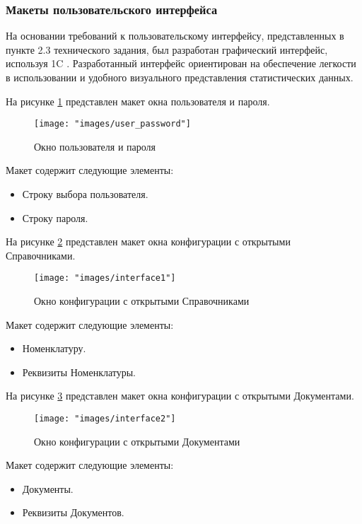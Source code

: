 \subsubsection{Макеты пользовательского интерфейса}

На основании требований к пользовательскому интерфейсу, представленных в пункте 2.3 технического задания, был разработан графический интерфейс, используя 1C . Разработанный интерфейс ориентирован на обеспечение легкости в использовании и удобного визуального представления статистических данных.

На рисунке \ref{fig:-user_password} представлен макет окна пользователя и пароля.
\begin{figure}
	\centering
	\texttt{[image: "images/user\_password"]}
	\caption{Окно пользователя и пароля}
	\label{fig:-user_password}
\end{figure}

Макет содержит следующие элементы:
\begin{itemize}
	\item Строку выбора пользователя.
	\item Строку пароля.
\end{itemize}

На рисунке \ref{fig:-interface1} представлен макет окна конфигурации с открытыми Справочниками.
\begin{figure}
	\centering
	\texttt{[image: "images/interface1"]}
	\caption{Окно конфигурации с открытыми Справочниками}
	\label{fig:-interface1}
\end{figure}

Макет содержит следующие элементы:
\begin{itemize}
	\item Номенклатуру.
	\item Реквизиты Номенклатуры.
\end{itemize}

На рисунке \ref{fig:-interface2} представлен макет окна конфигурации с открытыми Документами.
\begin{figure}
	\centering
	\texttt{[image: "images/interface2"]}
	\caption{Окно конфигурации с открытыми Документами}
	\label{fig:-interface2}
\end{figure}

Макет содержит следующие элементы:
\begin{itemize}
	\item Документы.
	\item Реквизиты Документов.
\end{itemize}

